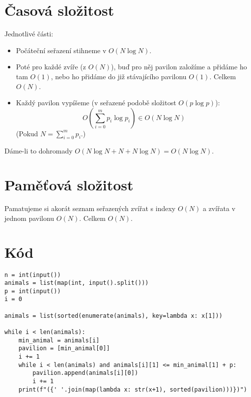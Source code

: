 \documentclass{article}
\begin{document}
\section{Časová složitost}
Jednotlivé části:
\begin{itemize}
    \item Počáteční seřazení stihneme v \(O(N \log N)\).
    \item Poté pro každé zvíře (z \(O(N)\)), buď pro něj pavilon založíme a přidáme ho tam \(O(1)\), nebo ho přidáme do již stávajícího pavilonu \(O(1)\). Celkem \(O(N)\).
    \item Každý pavilon vypíšeme (v seřazené podobě složitost \(O(p \log p)\)):
    \[O\left(\sum_{i=0}^m p_i \log p_i\right) \in O(N \log N)\]
    (Pokud \(N = \sum_{i=0}^m p_i\).)    
\end{itemize}

Dáme-li to dohromady \(O(N \log N + N + N \log N) = O(N \log N)\).

\section{Paměťová složitost}
Pamatujeme si akorát seznam seřazených zvířat s indexy \(O(N)\) a zvířata v jednom pavilonu \(O(N)\). Celkem \(O(N)\).

\section{Kód}
\begin{verbatim}
n = int(input())
animals = list(map(int, input().split()))
p = int(input())
i = 0

animals = list(sorted(enumerate(animals), key=lambda x: x[1]))

while i < len(animals):
    min_animal = animals[i]
    pavilion = [min_animal[0]]
    i += 1
    while i < len(animals) and animals[i][1] <= min_animal[1] + p:
        pavilion.append(animals[i][0])
        i += 1
    print(f"({' '.join(map(lambda x: str(x+1), sorted(pavilion)))})")
\end{verbatim}
\end{document}
